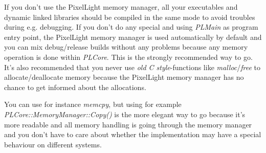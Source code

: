 If you don't use the PixelLight memory manager, all your executables and dynamic linked libraries should be compiled in the same mode to avoid troubles during e.g. debugging. If you don't do any special and using \emph{PLMain} as program entry point, the PixelLight memory manager is used automatically by default and you can mix debug/release builds without any problems because any memory operation is done within \emph{PLCore}. This is the strongly recommended way to go. It's also recommended that you never use \emph{old C style}-functions like \emph{malloc}/\emph{free} to allocate/deallocate memory because the PixelLight memory manager has no chance to get informed about the allocations.

You can use for instance \emph{memcpy}, but using for example \emph{PLCore::MemoryManager::Copy()} is the more elegant way to go because it's more readable and all memory handling is going through the memory manager and you don't have to care about whether the implementation may have a special behaviour on different systems.
